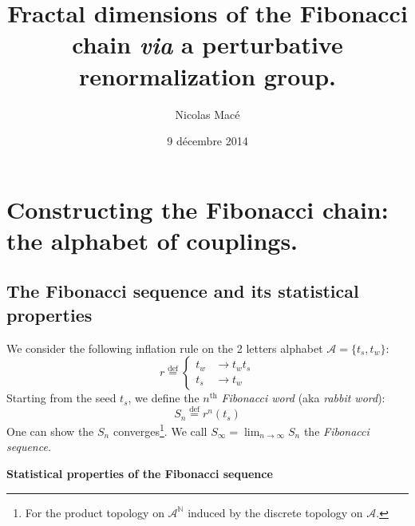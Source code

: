 \documentclass[11pt]{article}
\title{\textbf{Fractal dimensions of the Fibonacci chain \emph{via} a perturbative renormalization group.}}
\author{Nicolas Macé}
\date{9 décembre 2014}
\newcommand{\define}{\ensuremath{ \overset{\text{def}}{=} }}
\begin{document}

\maketitle

\section{Constructing the Fibonacci chain: the alphabet of couplings.}

\subsection{The Fibonacci sequence and its statistical properties}

We consider the following inflation rule on the 2 letters alphabet $\mathcal{A} = \{t_s, t_w \}$:
\begin{equation}
	r \define \begin{cases}
        t_{w} & \rightarrow t_w t_s \\
        t_s & \rightarrow t_w
      \end{cases}
\end{equation} 
Starting from the seed $t_s$, we define the $n^\text{th}$ \emph{Fibonacci word} (aka \emph{rabbit word}):
\begin{equation}
	S_n \define r^{n}(t_s)
\end{equation}
One can show the $S_n$ converges\footnote{For the product topology on $\mathcal{A}^\mathds{N}$ induced by the discrete topology on $\mathcal{A}$.}. We call $S_\infty = \lim_{n \rightarrow \infty} S_n$ the \emph{Fibonacci sequence}.

\textbf{Statistical properties of the Fibonacci sequence}
\end{document}
